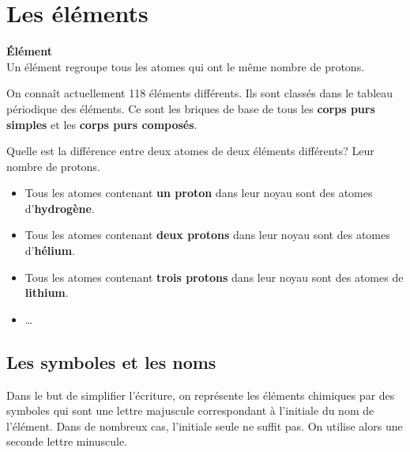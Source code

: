 \documentclass[
  11pt,
  a4paper,
  openany]{book}
\providecommand{\tightlist}{%
  \setlength{\itemsep}{0pt}\setlength{\parskip}{0pt}}
\begin{document}
\newpage

\hypertarget{les-uxe9luxe9ments}{%
\section{Les éléments}\label{les-uxe9luxe9ments}}

\begin{tcolorbox}
\textbf{Élément}\\
Un élément regroupe tous les atomes qui ont le même nombre de protons.

\end{tcolorbox}

On connaît actuellement 118 éléments différents. Ils sont classés dans le tableau périodique des éléments. Ce sont les briques de base de tous les \textbf{corps purs simples} et les \textbf{corps purs composés}.

Quelle est la différence entre deux atomes de deux éléments différents? Leur nombre de protons.

\begin{itemize}
\tightlist
\item
  Tous les atomes contenant \textbf{un proton} dans leur noyau sont des atomes d'\textbf{hydrogène}.
\item
  Tous les atomes contenant \textbf{deux protons} dans leur noyau sont des atomes d'\textbf{hélium}.
\item
  Tous les atomes contenant \textbf{trois protons} dans leur noyau sont des atomes de \textbf{lithium}.
\item
  \ldots{}
\end{itemize}

\hypertarget{les-symboles-et-les-noms}{%
\subsection{Les symboles et les noms}\label{les-symboles-et-les-noms}}

Dans le but de simplifier l'écriture, on représente les éléments chimiques par des symboles qui sont une lettre majuscule correspondant à l'initiale du nom de l'élément. Dans de nombreux cas, l'initiale seule ne suffit pas. On utilise alors une seconde lettre minuscule.
\end{document}
